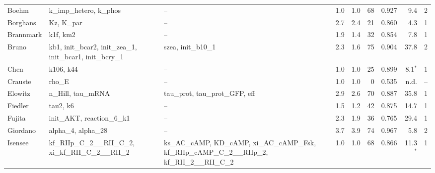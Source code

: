 \begin{longtable}{@{}>{\raggedright\arraybackslash}p{1.9cm}>{\raggedright\arraybackslash}p{3.9cm}>{\raggedright\arraybackslash}p{2.7cm}rrrrrc@{}}
Boehm & k\_\allowbreak{}imp\_\allowbreak{}hetero, \allowbreak{}k\_\allowbreak{}phos & -- & 1.0 & 1.0 & 68 & 0.927 & 9.4 & 2 \\
Borghans & Kz, \allowbreak{}K\_\allowbreak{}par & -- & 2.7 & 2.4 & 21 & 0.860 & 4.3 & 1 \\
Brannmark & k1f, \allowbreak{}km2 & -- & 1.9 & 1.4 & 32 & 0.854 & 7.8 & 1 \\
Bruno & kb1, \allowbreak{}init\_\allowbreak{}bcar2, \allowbreak{}init\_\allowbreak{}zea\_\allowbreak{}1, \allowbreak{}init\_\allowbreak{}bcar1, \allowbreak{}init\_\allowbreak{}bcry\_\allowbreak{}1 & szea, \allowbreak{}init\_\allowbreak{}b10\_\allowbreak{}1 & 2.3 & 1.6 & 75 & 0.904 & 37.8 & 2 \\
Chen & k106, \allowbreak{}k44 & -- & 1.0 & 1.0 & 25 & 0.899 & 8.1$^{\ast}$ & 1 \\
Crauste & rho\_\allowbreak{}E & -- & 1.0 & 1.0 & 0 & 0.535 & n.d. & -- \\
Elowitz & n\_\allowbreak{}Hill, \allowbreak{}tau\_\allowbreak{}mRNA & tau\_\allowbreak{}prot, \allowbreak{}tau\_\allowbreak{}prot\_\allowbreak{}GFP, \allowbreak{}eff & 2.9 & 2.6 & 70 & 0.887 & 35.8 & 1 \\
Fiedler & tau2, \allowbreak{}k6 & -- & 1.5 & 1.2 & 42 & 0.875 & 14.7 & 1 \\
Fujita & init\_\allowbreak{}AKT, \allowbreak{}reaction\_\allowbreak{}6\_\allowbreak{}k1 & -- & 2.3 & 1.9 & 36 & 0.765 & 29.4 & 1 \\
Giordano & alpha\_\allowbreak{}4, \allowbreak{}alpha\_\allowbreak{}28 & -- & 3.7 & 3.9 & 74 & 0.967 & 5.8 & 2 \\
Isensee & kf\_\allowbreak{}RIIp\_\allowbreak{}C\_\allowbreak{}2\_\allowbreak{}\_\allowbreak{}RII\_\allowbreak{}C\_\allowbreak{}2, \allowbreak{}xi\_\allowbreak{}kf\_\allowbreak{}RII\_\allowbreak{}C\_\allowbreak{}2\_\allowbreak{}\_\allowbreak{}RII\_\allowbreak{}2 & ks\_\allowbreak{}AC\_\allowbreak{}cAMP, \allowbreak{}KD\_\allowbreak{}cAMP, \allowbreak{}xi\_\allowbreak{}AC\_\allowbreak{}cAMP\_\allowbreak{}Fsk, \allowbreak{}kf\_\allowbreak{}RIIp\_\allowbreak{}cAMP\_\allowbreak{}C\_\allowbreak{}2\_\allowbreak{}\_\allowbreak{}RIIp\_\allowbreak{}2, \allowbreak{}kf\_\allowbreak{}RII\_\allowbreak{}2\_\allowbreak{}\_\allowbreak{}RII\_\allowbreak{}C\_\allowbreak{}2 & 1.0 & 1.0 & 68 & 0.866 & 11.3$^{\ast}$ & 1 \\

\end{longtable}
